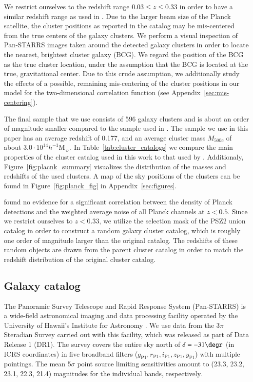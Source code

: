 \documentclass[iop, apjl, twocolappendix, numberedappendix]{emulateapj}
\begin{document}
We restrict ourselves to the redshift range $0.03 \leq z \leq 0.33$ in
order to have a similar redshift range as used in
\citet{more2016detection}. Due to the larger beam size of the Planck
satellite, the cluster positions as reported in the catalog may be
mis-centered from the true centers of the galaxy clusters. We perform
a visual inspection of Pan-STARRS images taken around the detected
galaxy clusters in order to locate the nearest, brightest cluster
galaxy (BCG). We regard the position of the BCG as the true cluster
location, under the assumption that the BCG is located at the true,
gravitational center. Due to this crude assumption, we additionally 
study the effects of a possible, remaining mis-centering of the 
cluster positions in our model for the two-dimensional correlation 
function (see Appendix~\ref{sec:mis-centering}). 

The final sample that we use consists of 596
galaxy clusters and is about an order of magnitude smaller compared
to the sample used in \citet{more2016detection}. The sample we use
in this paper has an average redshift of 0.177, and an average
cluster mass $M_{500c}$ of about $3.0 \cdot 10^{14}
h^{-1}$M$_{\sun}$. In Table~\ref{tab:cluster_catalogs} we compare
the main properties of the cluster catalog used in this work to that
used by \citet{more2016detection}. Additionaly, Figure~\ref{fig:placnk_summary}
visualizes the distribution of the masses and redshifts of the used clusters.
A map of the sky positions of the clusters
can be found in Figure~\ref{fig:planck_fig} in
Appendix~\ref{sec:figures}. 

\citet{kosyra2015environment} found no evidence for a significant
correlation between the density of Planck detections and the
weighted average noise of all Planck channels at $z<0.5$. Since we
restrict ourselves to $z<0.33$, we utilize the selection mask of the
PSZ2 union catalog in order to construct a random galaxy cluster
catalog, which is roughly one order of magnitude larger than the
original catalog. The redshifts of these random objects are drawn
from the parent cluster catalog in order to match the redshift
distribution of the original cluster catalog. 

\subsection{Galaxy catalog}
\label{sec:galaxies}
The Panoramic Survey Telescope and Rapid Response System
(Pan-STARRS) is a wide-field astronomical imaging and data
processing facility operated by the University of Hawaii's Institute
for Astronomy \citep{kaiser2002pan,kaiser2010pan}. We use data from
the 3$\pi$ Steradian Survey carried out with this facility, which
was released as part of Data Release 1 (DR1). The survey covers the
entire sky north of $\delta=-31\degr$ (in ICRS coordinates) in five
broadband filters ($g_{\mathrm{P1}}, r_{\mathrm{P1}},
i_{\mathrm{P1}}, z_{\mathrm{P1}}, y_{\mathrm{P1}}$) with multiple
pointings. The mean 5$\sigma$ point source limiting sensitivities
amount to (23.3, 23.2, 23.1, 22.3, 21.4) magnitudes for the
individual bands, respectively. 
\end{document}
